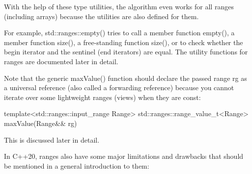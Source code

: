 With the help of these type utilities, the algorithm even works for all ranges (including arrays) because the utilities are also defined for them.

For example, std::ranges::empty() tries to call a member function empty(), a member function size(), a free-standing function size(), or to check whether the begin iterator and the sentinel (end iterators) are equal. The utility functions for ranges are documented later in detail.

Note that the generic maxValue() function should declare the passed range rg as a universal reference (also called a forwarding reference) because you cannot iterate over some lightweight ranges (views) when they are const:

\begin{cpp}
template<std::ranges::input_range Range>
std::ranges::range_value_t<Range> maxValue(Range&& rg)
\end{cpp}

This is discussed later in detail.


In C++20, ranges also have some major limitations and drawbacks that should be mentioned in a general introduction to them:

